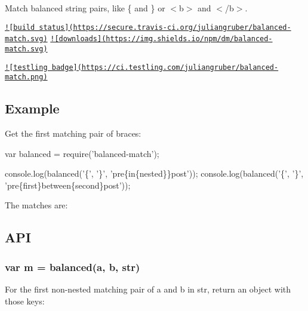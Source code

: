 Match balanced string pairs, like {\ttfamily \{} and {\ttfamily \}} or {\ttfamily $<$b$>$} and {\ttfamily $<$/b$>$}.

\href{http://travis-ci.org/juliangruber/balanced-match}{\tt !\mbox{[}build status\mbox{]}(https\+://secure.\+travis-\/ci.\+org/juliangruber/balanced-\/match.\+svg)} \href{https://www.npmjs.org/package/balanced-match}{\tt !\mbox{[}downloads\mbox{]}(https\+://img.\+shields.\+io/npm/dm/balanced-\/match.\+svg)}

\href{https://ci.testling.com/juliangruber/balanced-match}{\tt !\mbox{[}testling badge\mbox{]}(https\+://ci.\+testling.\+com/juliangruber/balanced-\/match.\+png)}

\subsection*{Example}

Get the first matching pair of braces\+:


\begin{DoxyCode}
var balanced = require(\textcolor{stringliteral}{'balanced-match'});

console.log(balanced(\textcolor{charliteral}{'\{'}, \textcolor{charliteral}{'\}'}, \textcolor{stringliteral}{'pre\{in\{nested\}\}post'}));
console.log(balanced(\textcolor{charliteral}{'\{'}, \textcolor{charliteral}{'\}'}, \textcolor{stringliteral}{'pre\{first\}between\{second\}post'}));
\end{DoxyCode}


The matches are\+:




\subsection*{A\+P\+I}

\subsubsection*{var m = balanced(a, b, str)}

For the first non-\/nested matching pair of {\ttfamily a} and {\ttfamily b} in {\ttfamily str}, return an object with those keys\+:


